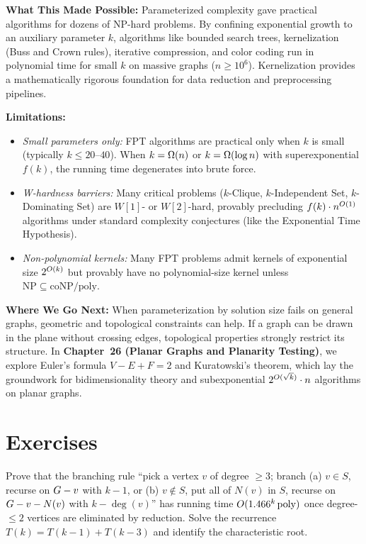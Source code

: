 \begin{connectionbox}
\textbf{What This Made Possible:}
Parameterized complexity gave practical algorithms for dozens of NP-hard problems.
By confining exponential growth to an auxiliary parameter $k$, algorithms like bounded
search trees, kernelization (Buss and Crown rules), iterative compression, and color
coding run in polynomial time for small $k$ on massive graphs ($n \ge 10^6$). Kernelization
provides a mathematically rigorous foundation for data reduction and preprocessing pipelines.

\textbf{Limitations:}
\begin{itemize}
  \item \emph{Small parameters only:} FPT algorithms are practical only when $k$ is small
        (typically $k \le 20\text{--}40$). When $k = \Omega(n)$ or $k = \Omega(\log n)$ with
        superexponential $f(k)$, the running time degenerates into brute force.
  \item \emph{W-hardness barriers:} Many critical problems ($k$-Clique, $k$-Independent Set,
        $k$-Dominating Set) are $W[1]$- or $W[2]$-hard, provably precluding $f(k)\cdot n^{O(1)}$
        algorithms under standard complexity conjectures (like the Exponential Time Hypothesis).
  \item \emph{Non-polynomial kernels:} Many FPT problems admit kernels of exponential size
        $2^{O(k)}$ but provably have no polynomial-size kernel unless $\mathrm{NP} \subseteq \mathrm{coNP/poly}$.
\end{itemize}

\textbf{Where We Go Next:}
When parameterization by solution size fails on general graphs, geometric and topological
constraints can help. If a graph can be drawn in the plane without crossing edges,
topological properties strongly restrict its structure. In \textbf{Chapter~26 (Planar Graphs
and Planarity Testing)}, we explore Euler's formula $V - E + F = 2$ and Kuratowski's theorem,
which lay the groundwork for bidimensionality theory and subexponential $2^{O(\sqrt{k})}\cdot n$
algorithms on planar graphs.
\end{connectionbox}

\section{Exercises}

\begin{exercise}
Prove that the branching rule ``pick a vertex $v$ of degree $\ge 3$; branch (a) $v\in S$, recurse on $G-v$ with $k-1$, or (b) $v\notin S$, put all of $N(v)$ in $S$, recurse on $G-v-N(v)$ with $k-\deg(v)$'' has running time $O(1.466^k\operatorname{poly})$ once degree-$\le 2$ vertices are eliminated by reduction. Solve the recurrence $T(k)=T(k-1)+T(k-3)$ and identify the characteristic root.
\end{exercise}

